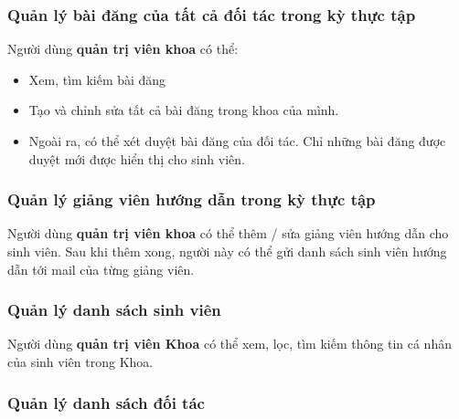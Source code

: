 \documentclass[./../main.tex]{subfiles}
\begin{document}
\hypertarget{quux1ea3n-luxfd-buxe0i-ux111ux103ng-cux1ee7a-tux1ea5t-cux1ea3-ux111ux1ed1i-tuxe1c-trong-kux1ef3-thux1ef1c-tux1eadp}{%
	\subsubsection{Quản lý bài đăng của tất cả đối tác trong kỳ thực
		tập}\label{quux1ea3n-luxfd-buxe0i-ux111ux103ng-cux1ee7a-tux1ea5t-cux1ea3-ux111ux1ed1i-tuxe1c-trong-kux1ef3-thux1ef1c-tux1eadp}}

Người dùng \textbf{quản trị viên khoa} có thể:

\begin{itemize}
	\item

	      Xem, tìm kiếm bài đăng

	\item

	      Tạo và chỉnh sửa tất cả bài đăng trong khoa của mình.

	\item

	      Ngoài ra, có thể xét duyệt bài đăng của đối tác. Chỉ những bài đăng
	      được duyệt mới được hiển thị cho sinh viên.

\end{itemize}

\hypertarget{quux1ea3n-luxfd-giux1ea3ng-viuxean-hux1b0ux1edbng-dux1eabn-trong-kux1ef3-thux1ef1c-tux1eadp}{%
	\subsubsection{Quản lý giảng viên hướng dẫn trong kỳ thực
		tập}\label{quux1ea3n-luxfd-giux1ea3ng-viuxean-hux1b0ux1edbng-dux1eabn-trong-kux1ef3-thux1ef1c-tux1eadp}}

Người dùng \textbf{quản trị viên khoa} có thể thêm / sửa giảng viên
hướng dẫn cho sinh viên. Sau khi thêm xong, người này có thể gửi danh
sách sinh viên hướng dẫn tới mail của từng giảng viên.

\hypertarget{quux1ea3n-luxfd-danh-suxe1ch-sinh-viuxean}{%
	\subsubsection{Quản lý danh sách sinh
		viên}\label{quux1ea3n-luxfd-danh-suxe1ch-sinh-viuxean}}

Người dùng \textbf{quản trị viên Khoa} có thể xem, lọc, tìm kiếm thông
tin cá nhân của sinh viên trong Khoa.

\hypertarget{quux1ea3n-luxfd-danh-suxe1ch-ux111ux1ed1i-tuxe1c}{%
	\subsubsection{Quản lý danh sách đối
		tác}\label{quux1ea3n-luxfd-danh-suxe1ch-ux111ux1ed1i-tuxe1c}}
\end{document}
